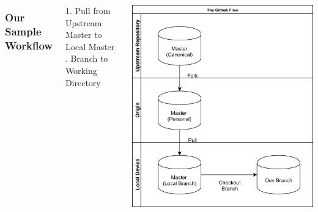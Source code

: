 \documentclass[unknownkeysallowed]{beamer}
\begin{document}
\begin{frame}
    \vspace{1cm}
	\begin{columns}
		\column{2.5in}
    \frametitle{Our Sample Workflow}
        1. Pull from Upstream Master to \\
        Local Master \linebreak{}. Branch to Working Directory \linebreak\linebreak
	\linebreak\linebreak
	\linebreak\linebreak
	\linebreak\linebreak
	\linebreak\linebreak
	\column{2.25in}
	\begin{center}
	\includegraphics[width = .9\linewidth]{assets/gitflow4}
	\end{center}
	\end{columns}
    \vspace{1cm}
\end{frame}
\end{document}
